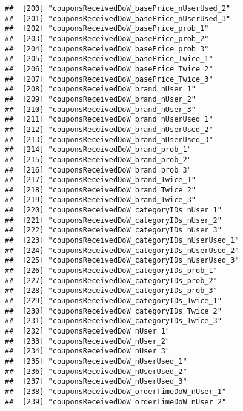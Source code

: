 \documentclass[10pt]{report}
\begin{document}
\begin{verbatim}
##  [200] "couponsReceivedDoW_basePrice_nUserUsed_2"             
##  [201] "couponsReceivedDoW_basePrice_nUserUsed_3"             
##  [202] "couponsReceivedDoW_basePrice_prob_1"                  
##  [203] "couponsReceivedDoW_basePrice_prob_2"                  
##  [204] "couponsReceivedDoW_basePrice_prob_3"                  
##  [205] "couponsReceivedDoW_basePrice_Twice_1"                 
##  [206] "couponsReceivedDoW_basePrice_Twice_2"                 
##  [207] "couponsReceivedDoW_basePrice_Twice_3"                 
##  [208] "couponsReceivedDoW_brand_nUser_1"                     
##  [209] "couponsReceivedDoW_brand_nUser_2"                     
##  [210] "couponsReceivedDoW_brand_nUser_3"                     
##  [211] "couponsReceivedDoW_brand_nUserUsed_1"                 
##  [212] "couponsReceivedDoW_brand_nUserUsed_2"                 
##  [213] "couponsReceivedDoW_brand_nUserUsed_3"                 
##  [214] "couponsReceivedDoW_brand_prob_1"                      
##  [215] "couponsReceivedDoW_brand_prob_2"                      
##  [216] "couponsReceivedDoW_brand_prob_3"                      
##  [217] "couponsReceivedDoW_brand_Twice_1"                     
##  [218] "couponsReceivedDoW_brand_Twice_2"                     
##  [219] "couponsReceivedDoW_brand_Twice_3"                     
##  [220] "couponsReceivedDoW_categoryIDs_nUser_1"               
##  [221] "couponsReceivedDoW_categoryIDs_nUser_2"               
##  [222] "couponsReceivedDoW_categoryIDs_nUser_3"               
##  [223] "couponsReceivedDoW_categoryIDs_nUserUsed_1"           
##  [224] "couponsReceivedDoW_categoryIDs_nUserUsed_2"           
##  [225] "couponsReceivedDoW_categoryIDs_nUserUsed_3"           
##  [226] "couponsReceivedDoW_categoryIDs_prob_1"                
##  [227] "couponsReceivedDoW_categoryIDs_prob_2"                
##  [228] "couponsReceivedDoW_categoryIDs_prob_3"                
##  [229] "couponsReceivedDoW_categoryIDs_Twice_1"               
##  [230] "couponsReceivedDoW_categoryIDs_Twice_2"               
##  [231] "couponsReceivedDoW_categoryIDs_Twice_3"               
##  [232] "couponsReceivedDoW_nUser_1"                           
##  [233] "couponsReceivedDoW_nUser_2"                           
##  [234] "couponsReceivedDoW_nUser_3"                           
##  [235] "couponsReceivedDoW_nUserUsed_1"                       
##  [236] "couponsReceivedDoW_nUserUsed_2"                       
##  [237] "couponsReceivedDoW_nUserUsed_3"                       
##  [238] "couponsReceivedDoW_orderTimeDoW_nUser_1"              
##  [239] "couponsReceivedDoW_orderTimeDoW_nUser_2"              

\end{verbatim}
\end{document}
